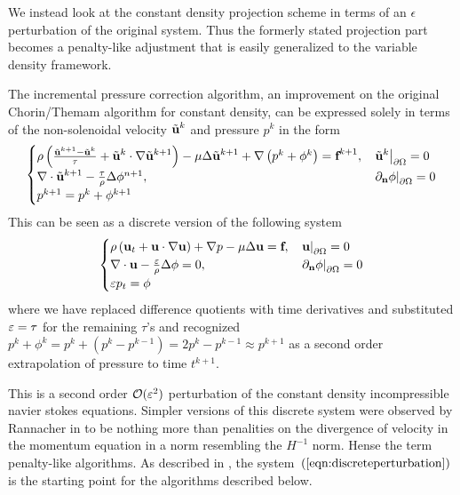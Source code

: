\documentclass[letterpaper]{erdc}
\begin{document}
We instead look at the constant density projection scheme in terms of an $\epsilon$ perturbation of the original system. Thus the formerly stated projection part becomes a penalty-like adjustment that is easily generalized to the variable density framework.

The incremental pressure correction algorithm, an improvement on the original Chorin/Themam algorithm for constant density, can be expressed solely in terms of the non-solenoidal velocity $\tilde{\textbf{u}}^{k}$ and pressure $p^{k}$ in the form
\begin{equation}
  \begin{cases}
    \rho\left(\frac{\tilde{\textbf{u}}^{k+1} - \tilde{\textbf{u}}^{k}}{\tau} + \tilde{\textbf{u}}^{k}\cdot\nabla\tilde{\textbf{u}}^{k+1} \right) - \mu\Delta\tilde{\textbf{u}}^{k+1} + \nabla\left(p^{k} + \phi^{k}  \right) = \textbf{f}^{k+1}, & \left.\tilde{\textbf{u}}^{k}\right|_{\partial\Omega} = 0\\
    \nabla\cdot\tilde{\textbf{u}}^{k+1} - \frac{\tau}{\rho}\Delta\phi^{n+1}, &\left.\partial_{\textbf{n}} \phi\right|_{\partial\Omega} = 0\\
    p^{k+1} = p^{k} + \phi^{k+1}
  \end{cases}
\end{equation}
This can be seen as a discrete version of the following system   
\begin{equation}\label{eqn:discreteperturbation}
  \begin{cases}
    \rho\left(\textbf{u}_t + \textbf{u}\cdot\nabla\textbf{u}  \right) + \nabla p -\mu\Delta\textbf{u} = \textbf{f}, & \left.\textbf{u}\right|_{\partial\Omega} = 0\\
    \nabla\cdot\textbf{u} - \frac{\varepsilon}{\rho}\Delta \phi = 0,& \left.\partial_{\textbf{n}} \phi\right|_{\partial\Omega} = 0\\
    \varepsilon p_t = \phi
  \end{cases}
\end{equation}
where we have replaced difference quotients with time derivatives and substituted $\varepsilon = \tau$ for the remaining $\tau$'s and recognized $p^{k} + \phi^{k} = p^{k} + \left( p^{k} - p^{k-1} \right) = 2p^{k} - p^{k-1} \approx p^{k+1}$ as a second order extrapolation of pressure to time $t^{k+1}$.

This is a second order $\mathcal{O}(\varepsilon^2)$ perturbation of the constant density incompressible navier stokes equations.  Simpler versions of this discrete system were observed by Rannacher in \cite{rannacher1992chorin} to be nothing more than penalities on the divergence of velocity in the momentum equation in a norm resembling the $H^{-1}$ norm.  Hense the term penalty-like algorithms.  As described in \cite{guermond2009splitting}, the system~$\left(\ref{eqn:discreteperturbation}\right)$ is the starting point for the algorithms described below.
\end{document}
